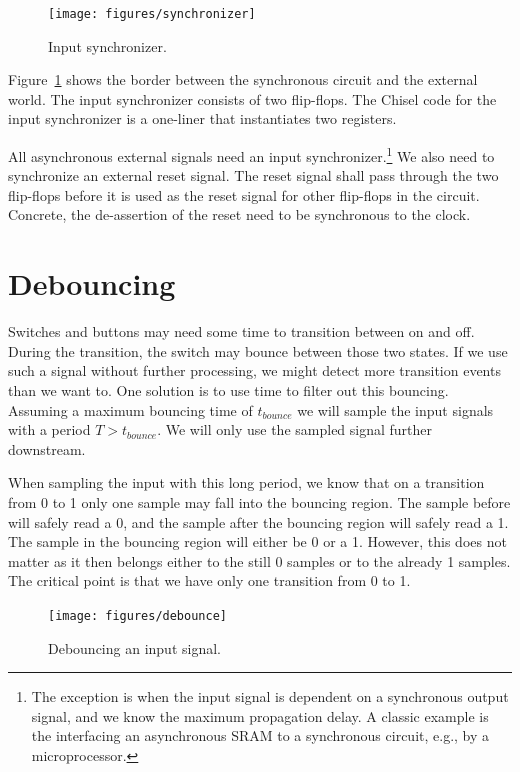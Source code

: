 \documentclass[%
    10pt,
    headinclude, footexclude,
    openright, %
    notitlepage,
    cleardoubleempty,
    headsepline,
    pointlessnumbers,
    bibtotoc, idxtotoc,
    ]{scrbook}
\begin{document}
\begin{figure}
  \centering
  \texttt{[image: figures/synchronizer]}
  \caption{Input synchronizer.}
  \label{fig:synchronizer}
\end{figure}

Figure~\ref{fig:synchronizer} shows the border between the synchronous
circuit and the external world. The input synchronizer consists of
two flip-flops. The Chisel code for the input synchronizer is a one-liner that
instantiates two registers.


All asynchronous external signals need an input
synchronizer.\footnote{The exception is when the input signal is dependent
on a synchronous output signal, and we know the maximum propagation delay.
A classic example is the interfacing an asynchronous SRAM
to a synchronous circuit, e.g., by a microprocessor.}
We also need to synchronize an external reset signal. The reset signal
shall pass through the two flip-flops before it is used as the reset signal
for other flip-flops in the circuit. Concrete, the de-assertion of the reset need
to be synchronous to the clock.

\section{Debouncing}

Switches and buttons may need some time to transition between on and off.
During the transition, the switch may bounce between those two states.
If we use such a signal without further processing, we might detect more
transition events than we want to. One solution is to use time to filter out
this bouncing. Assuming a maximum bouncing time of $t_{bounce}$ we will sample the
input signals with a period $T > t_{bounce}$. We will only use the
sampled signal further downstream.

When sampling the input with this long period, we know that on a transition
from 0 to 1 only one sample may fall into the bouncing region.
The sample before will safely read a 0, and the sample after the bouncing
region will safely read a 1. The sample in the bouncing region will
either be  0 or a 1. However, this does not matter as it then belongs either
to the still 0 samples or to the already 1 samples. The critical point
is that we have only one transition from 0 to 1.

\begin{figure}
  \centering
  \texttt{[image: figures/debounce]}
  \caption{Debouncing an input signal.}
  \label{fig:debounce}
\end{figure}
\end{document}

